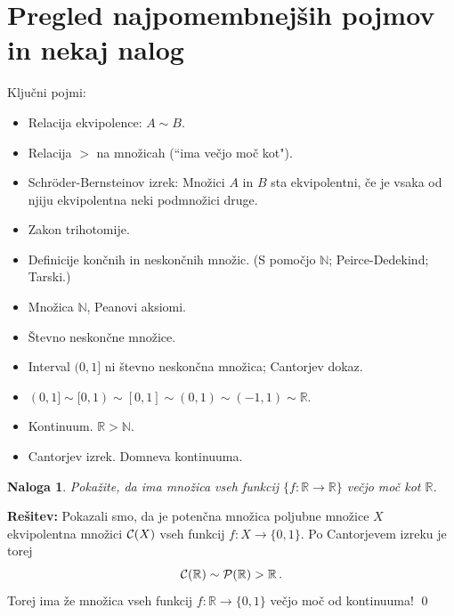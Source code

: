 \documentclass[11pt,paper=b5,DIV=13,headinclude,footinclude]{scrbook}
\newtheorem*{problem}{Naloga}
\begin{document}
\section{Pregled najpomembnejših pojmov in nekaj nalog}

Ključni pojmi:
\begin{itemize}
\item Relacija ekvipolence: $A\sim B$.
\item Relacija $>$ na množicah (``ima večjo moč kot").
\item Schröder-Bernsteinov izrek: Množici $A$ in $B$ sta ekvipolentni, če je vsaka od
njiju ekvipolentna neki podmnožici druge.
\item Zakon trihotomije.
\item Definicije končnih in neskončnih množic. (S pomočjo $\mathbb N$; Peirce-Dedekind; Tarski.)
\item Množica $\mathbb N$, Peanovi aksiomi.
\item Števno neskončne množice.
\item Interval $(0,1]$ ni števno neskončna množica; Cantorjev dokaz.
\item $(0,1]\sim [0,1)\sim [0,1]\sim (0,1)\sim (-1,1)\sim \mathbb{R}$.
\item Kontinuum. $\mathbb{R}>\mathbb{N}$.
\item Cantorjev izrek. Domneva kontinuuma.
\end{itemize}

\begin{problem}
Pokažite, da ima množica vseh funkcij
$\{f:\mathbb{R}\to \mathbb{R}\}$ večjo moč kot $\mathbb{R}$.
\end{problem}


\bigskip
\textbf{Rešitev:} Pokazali smo, da je potenčna množica poljubne množice $X$
ekvipolentna množici ${\cal C}(X)$ vseh funkcij $f:X\to \{0,1\}$.
Po Cantorjevem izreku je torej
$${\cal C}(\mathbb{R})\sim {\cal P}(\mathbb{R})>\mathbb{R}\,.$$
Torej ima že množica vseh funkcij $f:\mathbb{R}\to \{0,1\}$ večjo moč od kontinuuma!
\qed


%
%
\end{document}
